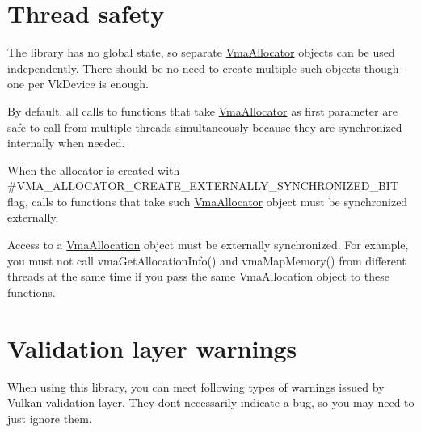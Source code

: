 \hypertarget{general_considerations_general_considerations_thread_safety}{}\section{Thread safety}\label{general_considerations_general_considerations_thread_safety}

\begin{DoxyItemize}
\item The library has no global state, so separate \hyperlink{structVmaAllocator}{Vma\+Allocator} objects can be used independently. There should be no need to create multiple such objects though -\/ one per {\ttfamily Vk\+Device} is enough.
\item By default, all calls to functions that take \hyperlink{structVmaAllocator}{Vma\+Allocator} as first parameter are safe to call from multiple threads simultaneously because they are synchronized internally when needed.
\item When the allocator is created with \#\+V\+M\+A\+\_\+\+A\+L\+L\+O\+C\+A\+T\+O\+R\+\_\+\+C\+R\+E\+A\+T\+E\+\_\+\+E\+X\+T\+E\+R\+N\+A\+L\+L\+Y\+\_\+\+S\+Y\+N\+C\+H\+R\+O\+N\+I\+Z\+E\+D\+\_\+\+B\+IT flag, calls to functions that take such \hyperlink{structVmaAllocator}{Vma\+Allocator} object must be synchronized externally.
\item Access to a \hyperlink{structVmaAllocation}{Vma\+Allocation} object must be externally synchronized. For example, you must not call vma\+Get\+Allocation\+Info() and vma\+Map\+Memory() from different threads at the same time if you pass the same \hyperlink{structVmaAllocation}{Vma\+Allocation} object to these functions.
\end{DoxyItemize}\hypertarget{general_considerations_general_considerations_validation_layer_warnings}{}\section{Validation layer warnings}\label{general_considerations_general_considerations_validation_layer_warnings}
When using this library, you can meet following types of warnings issued by Vulkan validation layer. They don\textquotesingle{}t necessarily indicate a bug, so you may need to just ignore them.


